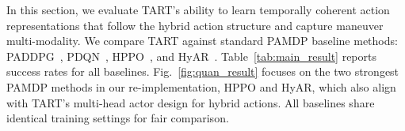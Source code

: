 In this section, we evaluate TART's ability to learn temporally coherent action representations that follow the hybrid action structure and capture maneuver multi-modality.
We compare TART against standard PAMDP baseline methods: PADDPG~\cite{hausknecht2015deep}, PDQN~\cite{xiong2018parametrized}, HPPO~\cite{fan2019hybrid}, and HyAR~\cite{li2021hyar}.
Table~\ref{tab:main_result} reports success rates for all baselines.
Fig.~\ref{fig:quan_result} focuses on the two strongest PAMDP methods in our re-implementation, HPPO and HyAR, which also align with TART's multi-head actor design for hybrid actions.
All baselines share identical training settings for fair comparison.